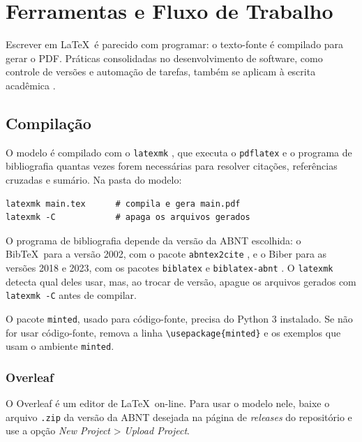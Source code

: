\chapter{Ferramentas e Fluxo de Trabalho}\label{cap:ferramentas}

Escrever em \LaTeX\ é parecido com programar: o texto-fonte é compilado para gerar o PDF. Práticas consolidadas no desenvolvimento de software, como controle de versões e automação de tarefas, também se aplicam à escrita acadêmica \cite{wilson2017}.

\section{Compilação}\label{sec:compilacao}

O modelo é compilado com o \texttt{latexmk} \cite{latexmk}, que executa o \texttt{pdflatex} e o programa de bibliografia quantas vezes forem necessárias para resolver citações, referências cruzadas e sumário. Na pasta do modelo:

\begin{verbatim}
latexmk main.tex      # compila e gera main.pdf
latexmk -C            # apaga os arquivos gerados
\end{verbatim}

O programa de bibliografia depende da versão da ABNT escolhida: o Bib\TeX\ para a versão 2002, com o pacote \texttt{abntex2cite} \cite{abntex2cite}, e o Biber para as versões 2018 e 2023, com os pacotes \texttt{biblatex} \cite{biblatex} e \texttt{biblatex-abnt} \cite{biblatexabnt}. O \texttt{latexmk} detecta qual deles usar, mas, ao trocar de versão, apague os arquivos gerados com \texttt{latexmk -C} antes de compilar.

O pacote \texttt{minted}, usado para código-fonte, precisa do Python 3 instalado. Se não for usar código-fonte, remova a linha \verb|\usepackage{minted}| e os exemplos que usam o ambiente \texttt{minted}.

\subsection{Overleaf}

O Overleaf é um editor de \LaTeX\ on-line. Para usar o modelo nele, baixe o arquivo \texttt{.zip} da versão da ABNT desejada na página de \textit{releases} do repositório e use a opção \textit{New Project} > \textit{Upload Project}.

